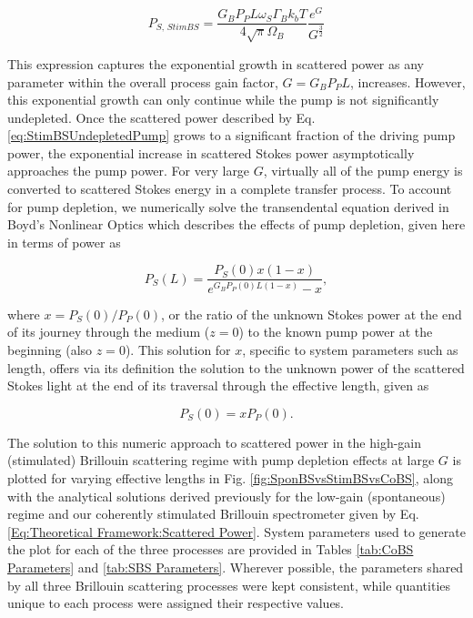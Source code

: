 \begin{equation}
  P_{S, \,\textit{StimBS}} = \frac{G_{B}P_{P}L\omega_{S}\Gamma_{B}k_{b}T}{4\sqrt{\pi}\Omega_{B}}\frac{e^{G}}{G^{\frac{3}{2}}}
  \label{eq:StimBSUndepletedPump}
\end{equation}

This expression captures the exponential growth in scattered power as any parameter within the overall process gain factor, $G = G_{B}P_{P}L$, increases. However, this exponential growth can only continue while the pump is not significantly undepleted. Once the scattered power described by Eq. \ref{eq:StimBSUndepletedPump} grows to a significant fraction of the driving pump power, the exponential increase in scattered Stokes power asymptotically approaches the pump power. For very large $G$, virtually all of the pump energy is converted to scattered Stokes energy in a complete transfer process.\cite{boyd2020nonlinear} To account for pump depletion, we numerically solve the transendental equation derived in Boyd's Nonlinear Optics which describes the effects of pump depletion, given here in terms of power as

\begin{equation}
  P_S(L) = \frac{P_S(0)x(1 - x)}{e^{G_{B}P_{P}(0)L(1 - x)} - x},
\end{equation}

where $x = P_S(0)/P_P(0)$, or the ratio of the unknown Stokes power at the end of its journey through the medium ($z=0$) to the known pump power at the beginning (also $z=0$). This solution for $x$, specific to system parameters such as length, offers via its definition the solution to the unknown power of the scattered Stokes light at the end of its traversal through the effective length, given as

\begin{equation}
  P_S(0) = xP_{P}(0).
\end{equation}

The solution to this numeric approach to scattered power in the high-gain (stimulated) Brillouin scattering regime with pump depletion effects at large $G$ is plotted for varying effective lengths in Fig. \ref{fig:SponBSvsStimBSvsCoBS}, along with the analytical solutions derived previously for the low-gain (spontaneous) regime and our coherently stimulated Brillouin spectrometer given by Eq. \ref{Eq:Theoretical Framework:Scattered Power}. System parameters used to generate the plot for each of the three processes are provided in Tables \ref{tab:CoBS Parameters} and \ref{tab:SBS Parameters}. Wherever possible, the parameters shared by all three Brillouin scattering processes were kept consistent, while quantities unique to each process were assigned their respective values.

